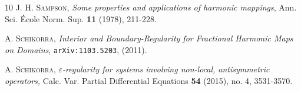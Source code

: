 \documentclass[12pt, a4paper]{article}
\renewcommand{\(}{\left(}
\renewcommand{\)}{\right)}
\begin{document}
\begin{thebibliography}{10}
 \textsc{J. H. Sampson,} \emph{Some properties and applications of harmonic mappings}, Ann. Sci. \'Ecole Norm. Sup. \textbf{11} (1978), 211-228.


 \textsc{A. Schikorra}, \emph{Interior and Boundary-Regularity for
Fractional Harmonic Maps on Domains}, \texttt{arXiv:1103.5203}, (2011).

\textsc{A. Schikorra}, \emph{$\varepsilon$-regularity for systems involving non-local, antisymmetric operators,}
Calc. Var. Partial Differential Equations \textbf{54} (2015), no. 4, 3531-3570.



\end{thebibliography}
\end{document}
